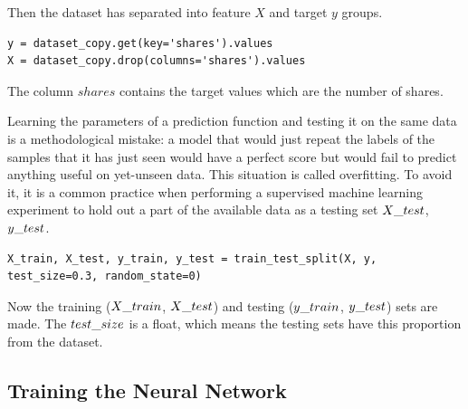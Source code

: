 \noindent Then the dataset has separated into feature $X$ and target $y$ groups.
\begin{lstlisting}
y = dataset_copy.get(key='shares').values
X = dataset_copy.drop(columns='shares').values
\end{lstlisting}
The column $shares$ contains the target values which are the number of shares.\medskip

Learning the parameters of a prediction function and testing it on the same data is a methodological mistake: a model that would just repeat the labels of the samples that it has just seen would have a perfect score but would fail to predict anything useful on yet-unseen data. This situation is called overfitting. To avoid it, it is a common practice when performing a supervised machine learning experiment to hold out a part of the available data as a testing set $X\char`_test$, $y\char`_test$. 
\begin{lstlisting}
X_train, X_test, y_train, y_test = train_test_split(X, y, test_size=0.3, random_state=0)
\end{lstlisting}
Now the training ($X\char`_train$, $X\char`_test$) and testing ($y\char`_train$, $y\char`_test$) sets are made. The $test\char`_size$ is a float, which means the testing sets have this proportion from the dataset.



\subsection{Training the Neural Network}

